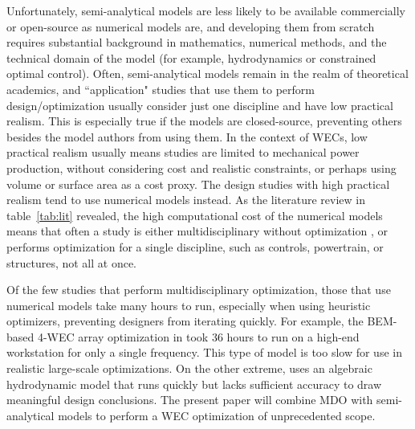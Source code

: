 Unfortunately, semi-analytical models are less likely to be available commercially or open-source as numerical models are, and developing them from scratch requires substantial background in mathematics, numerical methods, and the technical domain of the model (for example, hydrodynamics or constrained optimal control).
Often, semi-analytical models remain in the realm of theoretical academics, and ``application" studies that use them to perform design/optimization usually consider just one discipline and have low practical realism.
This is especially true if the models are closed-source, preventing others besides the model authors from using them.
In the context of WECs, low practical realism usually means studies are limited to mechanical power production, without considering cost and realistic constraints, or perhaps using volume or surface area as a cost proxy.
The design studies with high practical realism tend to use numerical models instead.
As the literature review in table~\ref{tab:lit} revealed, the high computational cost of the numerical models means that often a study is either multidisciplinary without optimization \cite{RM3,mi_multi-scale_2025}, or performs optimization for a single discipline, such as controls, powertrain, or structures, not all at once. 

Of the few studies that perform multidisciplinary optimization, those that use numerical models take many hours to run, especially when using heuristic optimizers, preventing designers from iterating quickly.
For example, the BEM-based 4-WEC array optimization in \cite{khanal_multi-objective_2024} took 36 hours to run on a high-end workstation for only a single frequency.
This type of model is too slow for use in realistic large-scale optimizations.
On the other extreme, \cite{mccabe_multidisciplinary_2022} uses an algebraic hydrodynamic model that runs quickly but lacks sufficient accuracy to draw meaningful design conclusions.
The present paper will combine MDO with semi-analytical models to perform a WEC optimization of unprecedented scope.

